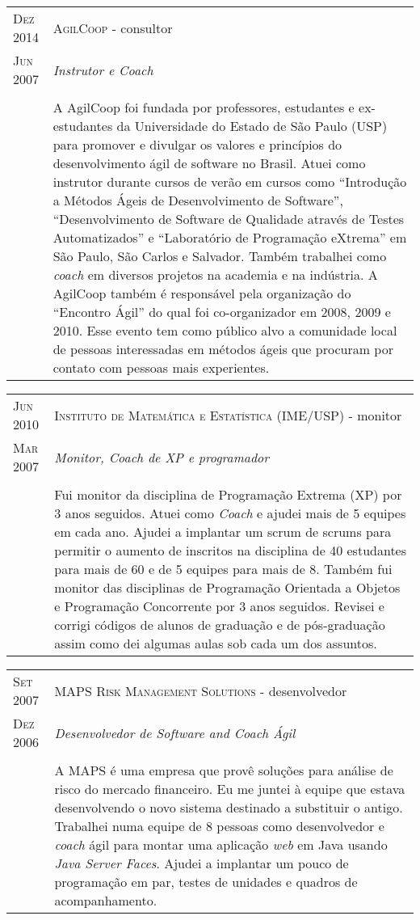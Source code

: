 \documentclass[letter,10pt]{article}
\begin{document}
\begin{tabular}{p{2.5cm}|p{13.5cm}}
  \textsc{Dez 2014} & \textsc{AgilCoop} - consultor\\
  \textsc{Jun 2007}& \emph{Instrutor e Coach}\\
  &\\
  &A AgilCoop foi fundada por professores, estudantes e ex-estudantes
  da Universidade do Estado de São Paulo (USP) para promover e
  divulgar os valores e princípios do desenvolvimento ágil de software
  no Brasil. Atuei como instrutor durante cursos de verão em cursos
  como ``Introdução a Métodos Ágeis de Desenvolvimento de Software'',
  ``Desenvolvimento de Software de Qualidade através de Testes
  Automatizados'' e ``Laboratório de Programação eXtrema'' em São
  Paulo, São Carlos e Salvador.
  Também trabalhei como \textit{coach} em diversos projetos na
  academia e na indústria. A AgilCoop também é responsável pela
  organização do ``Encontro Ágil'' do qual foi co-organizador em 2008,
  2009 e 2010. Esse evento tem como público alvo a comunidade local de
  pessoas interessadas em métodos ágeis que procuram por contato com
  pessoas mais experientes.
\end{tabular}

\begin{tabular}{p{2.5cm}|p{13.5cm}}
  \textsc{Jun 2010} & \textsc{Instituto de Matemática e Estatística
    (IME/USP)} - monitor\\
  \textsc{Mar 2007}& \emph{Monitor, \textit{Coach} de XP e programador}\\
  &\\
  & Fui monitor da disciplina de Programação Extrema (XP) por 3 anos
  seguidos. Atuei como \textit{Coach} e ajudei mais de 5 equipes em
  cada ano. Ajudei a implantar um scrum de scrums para permitir o
  aumento de inscritos na disciplina de 40 estudantes para mais de 60
  e de 5 equipes para mais de 8. Também fui monitor das disciplinas de
  Programação Orientada a Objetos e Programação Concorrente por 3 anos
  seguidos. Revisei e corrigi códigos de alunos de graduação e de
  pós-graduação assim como dei algumas aulas sob cada um dos assuntos.
\end{tabular}

\begin{tabular}{p{2.5cm}|p{13.5cm}}
  \textsc{Set 2007} & \textsc{MAPS Risk
    Management Solutions} - desenvolvedor\\
  \textsc{Dez 2006} &\emph{Desenvolvedor de Software and Coach Ágil}\\
  &\\
  & A MAPS é uma empresa que provê soluções para análise de risco do
  mercado financeiro. Eu me juntei à equipe que estava desenvolvendo o
  novo sistema destinado a substituir o antigo. Trabalhei numa equipe
  de 8 pessoas como desenvolvedor e \textit{coach} ágil para montar
  uma aplicação \textit{web} em Java usando \textit{Java Server
    Faces}. Ajudei a implantar um pouco de programação em par, testes
  de unidades e quadros de acompanhamento.
\end{tabular}
\end{document}
